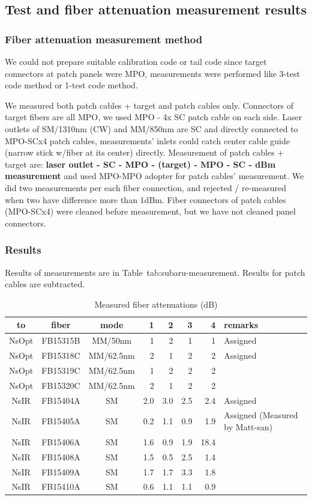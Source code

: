 \documentclass[a4paper,notitlepage]{article}
\begin{document}
\subsection{Test and fiber attenuation measurement results} 

\subsubsection{Fiber attenuation measurement method}

We could not prepare suitable calibration code or tail code since 
target connectors at patch panels were MPO, measurements were performed 
like 3-test code method or 1-test code method. 

We measured both patch cables + target and patch cables only. 
Connectors of target fibers are all MPO, we used MPO - 4x SC patch cable on 
each side. Laser outlets of SM/1310nm (CW) and MM/850nm are SC and directly 
connected to MPO-SCx4 patch cables, 
measurements' inlets could catch center cable guide (narrow stick w/fiber 
at its center) directly.
Measurement of patch cables + target are:
{\bf laser outlet - SC - MPO - (target) - MPO - SC - dBm measurement} 
and used MPO-MPO adopter for patch cables' measurement.
We did two measurements per each fiber connection, and rejected / re-measured 
when two have difference more than 1dBm. 
Fiber connectors of patch cables (MPO-SCx4) were cleaned before measurement, 
but we have not cleaned panel connectors. 

\subsubsection{Results}

Results of measurements are in Table~{tab:subaru-measurement}. 
Results for patch cables are subtracted. 

\begin{table}[htb]
\begin{center}
\caption{Measured fiber attenuations (dB)}
\label{tab:subaru-measurement}
\begin{tabular}{c|c|c||r|r|r|r||l}
to & fiber & mode & 1 & 2 & 3 & 4 & remarks \\
\hline
NsOpt & FB15315B & MM/50nm & 1 & 2 & 1 & 1 & Assigned \\
NsOpt & FB15318C & MM/62.5nm & 2 & 1 & 2 & 2 & Assigned \\
NsOpt & FB15319C & MM/62.5nm & 1 & 2 & 2 & 2 & \\
NsOpt & FB15320C & MM/62.5nm & 2 & 1 & 2 & 2 & \\
NsIR & FB15404A & SM & 2.0 & 3.0 & 2.5 & 2.4 & Assigned \\
NsIR & FB15405A & SM & 0.2 & 1.1 & 0.9 & 1.9 & Assigned (Measured by Matt-san) \\
NsIR & FB15406A & SM & 1.6 & 0.9 & 1.9 & 18.4 & \\
NsIR & FB15408A & SM & 1.5 & 0.5 & 2.5 & 1.4 &  \\
NsIR & FB15409A & SM & 1.7 & 1.7 & 3.3 & 1.8 &  \\
NsIR & FB15410A & SM & 0.6 & 1.1 & 1.1 & 0.9 &  \\
\end{tabular}
\end{center}
\end{table}
\end{document}
